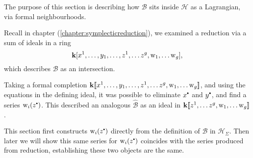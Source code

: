     The purpose of this section is describing how \( \mathcal{B}\) sits inside \( \mathcal{H}\) as a Lagrangian, via formal neighbourhoods. 
    
    Recall in chapter (\ref{chapter:symplecticreduction}), we examined a reduction via a sum of ideals in a ring \[ \mathbf{k}[x^1, \dots , y_1, \dots ,z^1, \dots z^g, \mathrm{w}_1, \dots \mathrm{w}_g],\] which describes \( \mathcal{B}\) as an intersection.
    
    Taking a formal completion \( \mathbf{k} [\![ x^1, \dots , y_1, \dots ,z^1, \dots z^g, \mathrm{w}_1, \dots \mathrm{w}_g ]\!] \), and using the equations in the defining ideal, it was possible to eliminate \(x^{\sbt}\) and \(y^{\sbt}\), and find a series \(\w_i(z^{\sbt})\). This described an analogous \( \widehat{\mathcal{B}}\) as an ideal in  \(\mathbf{k} [\![ z^1, \dots z^g, \mathrm{w}_1, \dots \mathrm{w}_g ]\!] \).
    
    This section first constructs \( \w_i(z^{\sbt})\) directly from the definition of \( \mathcal{B}\) in \( \mathcal{H}_\Sigma\). Then later we will show this same series for \( \w_{i}(z^{\sbt})\) coincides with the series produced from reduction, establishing these two objects are the same.
    
